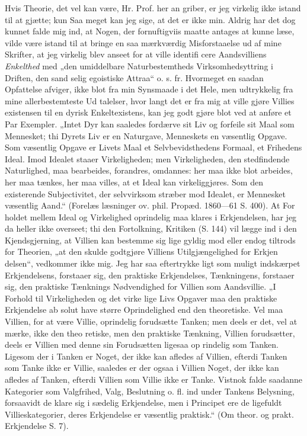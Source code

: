\documentclass[12pt]{book}
\newcommand{\opage}[1]{\marginnote{\footnotesize\textit{[#1]}}}
\begin{document}
Hvis Theorie, det vel kan være, Hr. Prof. her an\-%
griber, er jeg virkelig ikke istand til at gjætte; kun Saa\-%
meget kan jeg sige, at det er ikke min. Aldrig har det
dog kunnet falde mig ind, at Nogen, der fornuftigviis
maatte antages at kunne læse, vilde være istand til at
bringe en saa mærkværdig Misforstaaelse ud af mine
Skrifter, at jeg virkelig blev anseet for at ville identifi\-%
cere Aandsvilliens \emph{Enkelthed} med „den umiddelbare
Naturbestemtheds Virksomhedsyttring i Driften, den sand\-%
selig egoistiske Attraa“ o. s. fr. Hvormeget en saadan
Opfattelse afviger, ikke blot fra min Synsmaade i det
Hele, men udtrykkelig fra mine allerbestemteste Ud\-%
talelser, hvor langt det er fra mig at ville gjøre Villies\-%
existensen til en dyrisk Enkeltexistens, kan jeg godt\-%
gjøre blot ved at anføre et Par Exempler. „Intet Dyr
kan saaledes fordærve sit Liv og forfeile sit Maal som
Mennesket; thi Dyrets Liv er en Naturgave, Menneskets
en væsentlig Opgave. Som væsentlig Opgave er Livets
Maal et Selvbevidsthedens Formaal, et Frihedens Ideal.
Imod Idealet staaer Virkeligheden; men Virkeligheden,
den stedfindende Naturlighed, maa bearbeides, forandres,
omdannes: her maa ikke blot arbeides, her maa tænkes,
her maa villes, at et Ideal kan virkeliggjøres. Som
den existerende Subjectivitet, der selvvirksom stræber
mod Idealet, er Mennesket væsentlig Aand.“ (Forelæs\-%
læsninger ov. phil. Propæd. 1860---61 S. 400). At For\-%
holdet mellem Ideal og Virkelighed oprindelig maa
klares i Erkjendelsen, har jeg da heller ikke overseet;
thi den Fortolkning, Kritiken (S. 144) vil lægge ind i
den Kjendsgjerning, at Villien kan bestemme sig lige\-%
\opage{33}\setcounter{footnote}{0}%
gyldig mod eller endog tiltrods for Theorien, „at den
skulde godtgjøre Villiens Utilgjængelighed for Erkjen\-%
delsen“, vedkommer ikke mig. Jeg har saa eftertrykke\-%
ligt som muligt indskærpet Erkjendelsens, forstaaer sig,
den praktiske Erkjendelses, Tænkningens, forstaaer sig,
den praktiske Tænknings Nødvendighed for Villien som
Aandsvillie. „I Forhold til Virkeligheden og det virke\-%
lige Livs Opgaver maa den praktiske Erkjendelse ab\-%
solut have større Oprindelighed end den theoretiske. Vel
maa Villien, for at være Villie, oprindelig forudsætte
Tanken; men deels er det, vel at mærke, ikke den theo\-%
retiske, men den praktiske Tænkning, Villien forudsætter,
deels er Villien med denne sin Forudsætten ligesaa op\-%
rindelig som Tanken. Ligesom der i Tanken er Noget,
der ikke kan afledes af Villien, efterdi Tanken som Tanke
ikke er Villie, saaledes er der ogsaa i Villien Noget, der
ikke kan afledes af Tanken, efterdi Villien som Villie
ikke er Tanke. Vistnok falde saadanne Kategorier som
Valgfrihed, Valg, Beslutning o. fl. ind under Tankens
Belysning, forsaavidt de klare sig i sædelig Erkjendelse,
men i Principet ere de ligefuldt Villieskategorier, deres
Erkjendelse er væsentlig praktisk.“ (Om theor. og prakt.
Erkjendelse S. 7).
\end{document}
